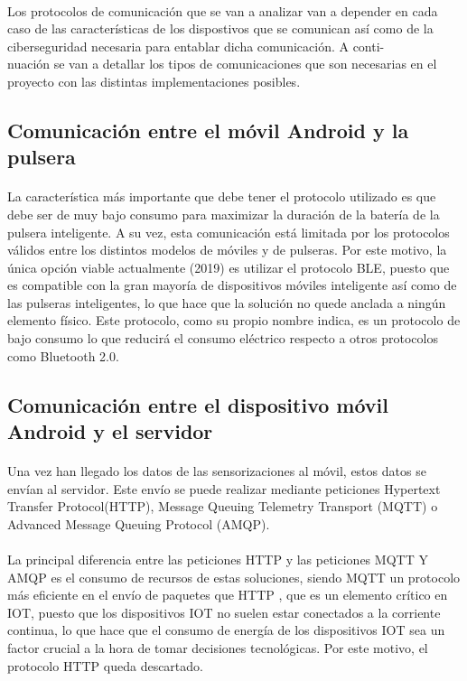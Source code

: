 \paragraph{}
Los protocolos de comunicación que se van a analizar van a depender en cada caso de las características de los dispostivos que se comunican así como de la ciberseguridad necesaria para entablar dicha comunicación. A conti-\\nuación se van a detallar los tipos de comunicaciones que son necesarias en el proyecto con las distintas implementaciones posibles.

\subsection{Comunicación entre el móvil Android y la pulsera}
\paragraph{}
La característica más importante que debe tener el protocolo utilizado es que debe ser de muy bajo consumo para maximizar la duración de la batería de la pulsera inteligente. A su vez, esta comunicación está limitada por los protocolos válidos entre los distintos modelos de móviles y de pulseras. Por este motivo, la única opción viable actualmente (2019) es utilizar el protocolo BLE, puesto que es compatible con la gran mayoría de dispositivos móviles inteligente así como de las pulseras inteligentes, lo que hace que la solución no quede anclada a ningún elemento físico. Este protocolo, como su propio nombre indica, es un protocolo de bajo consumo lo que reducirá el consumo eléctrico respecto a otros protocolos como Bluetooth 2.0.

\subsection{Comunicación entre el dispositivo móvil Android y el servidor}
\label{subsec:comAndroidServ}
\paragraph{}
Una vez han llegado los datos de las sensorizaciones al móvil, estos datos se envían al servidor. Este envío se puede realizar mediante peticiones Hypertext Transfer Protocol(HTTP), Message Queuing Telemetry Transport (MQTT) o Advanced Message Queuing Protocol (AMQP).

\paragraph{}
La principal diferencia entre las peticiones HTTP y las peticiones MQTT Y AMQP es el consumo de recursos de estas soluciones, siendo MQTT un protocolo más eficiente en el envío de paquetes que HTTP \citep{yokotani2016comparison}, que es un elemento crítico en IOT, puesto que los dispositivos IOT no suelen estar conectados a la corriente continua, lo que hace que el consumo de energía de los dispositivos IOT sea un factor crucial a la hora de tomar decisiones tecnológicas. Por este motivo, el protocolo HTTP queda descartado.

